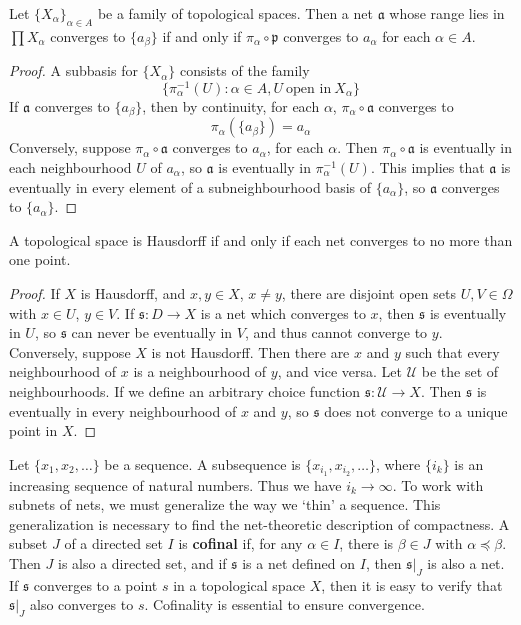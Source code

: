 \begin{example}
\begin{theorem}
    Let $\{ X_\alpha \}_{\alpha \in A}$ be a family of topological spaces. Then a net $\mathfrak{a}$ whose range lies in $\prod X_\alpha$ converges to $\{ a_\beta \}$ if and only if $\pi_\alpha \circ \mathfrak{p}$ converges to $a_\alpha$ for each $\alpha \in A$.
\end{theorem}
\begin{proof}
    A subbasis for $\{ X_\alpha \}$ consists of the family
    \[ \{ \pi_\alpha^{-1}(U) : \alpha \in A, U \ \text{open in}\ X_\alpha \} \]
    If $\mathfrak{a}$ converges to $\{ a_\beta \}$, then by continuity, for each $\alpha$, $\pi_\alpha \circ \mathfrak{a}$ converges to
    \[ \pi_\alpha( \{ a_\beta \}) = a_\alpha \]
    Conversely, suppose $\pi_\alpha \circ \mathfrak{a}$ converges to $a_\alpha$, for each $\alpha$. Then $\pi_\alpha \circ \mathfrak{a}$ is eventually in each neighbourhood $U$ of $a_\alpha$, so $\mathfrak{a}$ is eventually in $\pi_\alpha^{-1}(U)$. This implies that $\mathfrak{a}$ is eventually in every element of a subneighbourhood basis of $\{ a_\alpha \}$, so $\mathfrak{a}$ converges to $\{ a_\alpha \}$.
\end{proof}

\begin{theorem}
    A topological space is Hausdorff if and only if each net converges to no more than one point.
\end{theorem}
\begin{proof}
    If $X$ is Hausdorff, and $x,y \in X$, $x \neq y$, there are disjoint open sets $U,V \in \Omega$ with $x \in U$, $y \in V$. If $\mathfrak{s}: D \to X$ is a net which converges to $x$, then $\mathfrak{s}$ is eventually in $U$, so $\mathfrak{s}$ can never be eventually in $V$, and thus cannot converge to $y$. Conversely, suppose $X$ is not Hausdorff. Then there are $x$ and $y$ such that every neighbourhood of $x$ is a neighbourhood of $y$, and vice versa. Let $\mathcal{U}$ be the set of neighbourhoods. If we define an arbitrary choice function $\mathfrak{s}: \mathcal{U} \to X$. Then $\mathfrak{s}$ is eventually in every neighbourhood of $x$ and $y$, so $\mathfrak{s}$ does not converge to a unique point in $X$.
\end{proof}

Let $\{ x_1, x_2, \dots \}$ be a sequence. A subsequence is $\{ x_{i_1}, x_{i_2}, \dots \}$, where $\{ i_k \}$ is an increasing sequence of natural numbers. Thus we have $i_k \to \infty$. To work with subnets of nets, we must generalize the way we `thin' a sequence. This generalization is necessary to find the net-theoretic description of compactness. A subset $J$ of a directed set $I$ is {\bf cofinal} if, for any $\alpha \in I$, there is $\beta \in J$ with $\alpha \preceq \beta$. Then $J$ is also a directed set, and if $\mathfrak{s}$ is a net defined on $I$, then $\mathfrak{s}|_J$ is also a net. If $\mathfrak{s}$ converges to a point $s$ in a topological space $X$, then it is easy to verify that $\mathfrak{s}|_J$ also converges to $s$. Cofinality is essential to ensure convergence.


\end{example}
